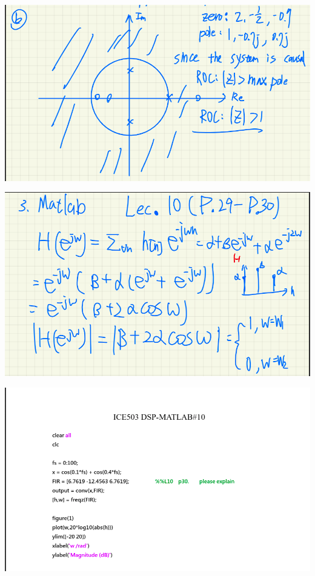 \documentclass[a4paper]{article}
\begin{document}
	
	\begin{center}
		\includegraphics[width=1\linewidth]{screenshot110}
	\end{center}
	
	
	
	\begin{center}
		\includegraphics[width=1\linewidth]{screenshot111}
	\end{center}
	
	
	
	\begin{center}
		\includegraphics[width=1\linewidth]{screenshot113}
	\end{center}
	
\end{document}
